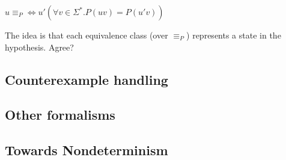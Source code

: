 \begin{center}
	$u \equiv_{P} \Leftrightarrow u'( \forall v \in \Sigma^*. P(uv) = P(u'v))$ %
\end{center}

The idea is that each equivalence class (over $\equiv_{P}$) represents a state in the hypothesis. Agree?

\subsection{Counterexample handling}

\subsection{Other formalisms}

\subsection{Towards Nondeterminism}